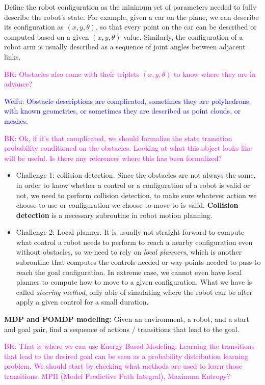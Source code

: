 \documentclass{article}
\begin{document}
Define the robot configuration as the minimum set of parameters needed to fully describe the robot's state. For example, given a car on the plane, we can describe its configuration as $(x, y, \theta)$, so that every point on the car can be described or computed based on a given $(x, y, \theta)$ value. Similarly, the configuration of a robot arm is usually described as a sequence of joint angles between adjacent links. 

\textcolor{magenta}{BK: Obstacles also come with their triplets $(x, y, \theta)$ to know where they are in advance?}

\textcolor{blue}{Weifu: Obstacle descriptions are complicated, sometimes they are polyhedrons, with known geometries, or sometimes they are described as point clouds, or meshes. }

\textcolor{magenta}{BK: Ok, if it's that complicated, we should formalize the state transition probability conditioned on the obstacles. Looking at what this object looks like will be useful. Is there any references where this has been formalized?}

\begin{itemize}
\item Challenge 1: collision detection. Since the obstacles are not always the same, in order to know whether a control or a configuration of a robot is valid or not, we need to perform collision detection, to make sure whatever action we choose to use or configuration we choose to move to is valid. \textbf{Collision detection} is a necessary subroutine in robot motion planning. 

\item Challenge 2: Local planner. It is usually not straight forward to compute what control a robot needs to perform to reach a nearby configuration even without obstacles, so we need to rely on {\em local planners}, which is another subroutine that computes the controls needed or way-points needed to pass to reach the goal configuration. 
In extreme case, we cannot even have local planner to compute how to move to a given configuration. What we have is called \emph{steering method}, only able of simulating where the robot can be after apply a given control for a small duration.
\end{itemize}

\noindent\textbf{MDP and POMDP modeling:} Given an environment, a robot, and a start and goal pair, find a sequence of actions / transitions that lead to the goal. 

\textcolor{magenta}{BK: That is where we can use Energy-Based Modeling. Learning the transitions that lead to the desired goal can be seen as a probability distribution learning problem.
We should start by checking what methods are used to learn those transitions: MPII (Model Predictive Path Integral), Maximum Entropy? }
\end{document}
